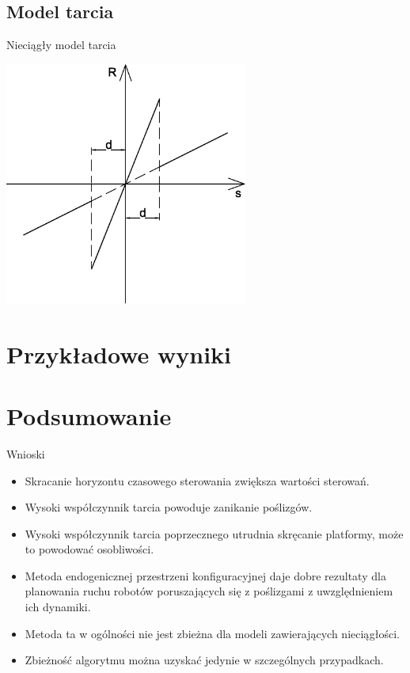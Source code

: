 \documentclass{beamer}
\begin{document}
\subsection{Model tarcia}
\begin{frame}{Nieciągły model tarcia}
\begin{center}
\includegraphics[width=0.6\textwidth]{img/discont.eps}
\end{center}
\end{frame}

\section{Przykładowe wyniki}

\section{Podsumowanie}
\begin{frame}{Wnioski}
\begin{itemize}
\item Skracanie horyzontu czasowego sterowania zwiększa wartości sterowań.
\item Wysoki współczynnik tarcia powoduje zanikanie poślizgów.
\item Wysoki współczynnik tarcia poprzecznego utrudnia skręcanie platformy, może to powodować osobliwości.
\item Metoda endogenicznej przestrzeni konfiguracyjnej daje dobre rezultaty dla planowania ruchu robotów poruszających się z poślizgami z uwzględnieniem ich dynamiki.
\item Metoda ta w ogólności nie jest zbieżna dla modeli zawierających nieciągłości.
\item Zbieżność algorytmu można uzyskać jedynie w szczególnych przypadkach.
\end{itemize}
\end{frame}
\end{document}
